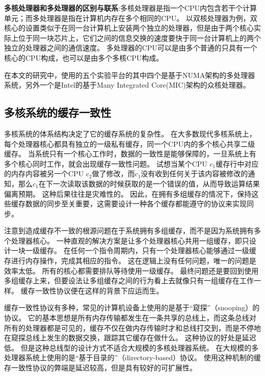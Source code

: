 \textbf{多核处理器和多处理器的区别与联系}:多核处理器是指一个CPU内包含若干个计算单元；而多处理器是指在计算机内存在多个相同的CPU。
以双核处理器为例，双核心的设置类似于在同一台计算机上安装两个独立的处理器，但是由于两个核心实际上位于同一块芯片上，它们之间的信息交换的速度要快于同一台计算机上的两个独立的处理器之间的通信速度。
多处理器的CPU可以是由多个普通的只具有一个核心的CPU构成，也可以是由多个多核CPU构成。

在本文的研究中，使用的五个实验平台的其中四个是基于NUMA架构的多处理器系统，另外一个是Intel的基于Many Integrated Core(MIC)架构的众核处理器。

\subsection{多核系统的缓存一致性}
多核系统的体系结构决定了它的缓存系统的复杂性。
在大多数现代多核系统上，每个处理器核心都具有独立的一级私有缓存，同一个CPU内的多个核心共享二级缓存。
当系统只有一个核心工作时，数据的一致性是能够保障的，一旦系统上有多个核心同时工作，就会出现缓存一致性问题。
试想当某个CPU $c_1$缓存行中对应的内存内容被另一个CPU $c_2$做了修改，而$c_1$没有收到任何关于该内容被修改的通知，那么$c_1$在下一次读取该数据的时候获取的是一个错误的值，从而导致运算结果偏离预期。
这种后果往往是灾难性的。
因此，在拥有多组缓存的情况下，保持这些缓存数据的同步至关重要，这需要设计一种各个缓存都能遵守的协议来实现同步。

注意到造成缓存不一致的根源问题在于系统拥有多组缓存，而不是因为系统拥有多个处理器核心。
一种直观的解决方案是让多个处理器核心共用一组缓存，即只设计一块一级缓存。
在任何一个指令周期内，只有一个处理器核心能够通过一级缓存进行内存操作，完成其相应的指令。
这在逻辑上没有任何问题，唯一的问题是效率太低。
所有的核心都需要排队等待使用一级缓存。
最终问题还是要回到使用多组缓存上来，但要设法让多组缓存之间的行为看上去就像只有一组缓存在工作一样。
缓存一致性协议便在这样的背景下应运而生。

缓存一致性协议有多种，常见的计算机设备上使用的是基于“窥探”（snooping）的协议。
它的基本思想是所有内存传输都发生在一条共享的总线上，而这条总线对所有的处理器都是可见的，缓存不仅在做内存传输时才和总线打交到，而是不停地在窥探总线上发生的数据交换，跟踪其它缓存在做什么。
这种协议的好处是延迟低。
但是这种总线型的设计方式不适合大规模的多核处理器系统。
在大规模的多处理器系统上使用的是“基于目录的”（directory-based）协议。
使用这种机制的缓存一致性协议的弊端是延迟较高，但是具有较好的可扩展性。

